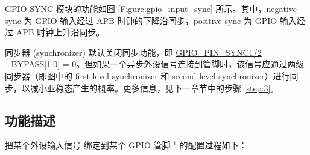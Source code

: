 \documentclass[main\_\_CN.tex]{subfiles}
\begin{document}
GPIO SYNC 模块的功能如图 \ref{Figure:gpio_input_sync} 所示。其中，negative sync 为 GPIO 输入经过 APB 时钟的下降沿同步，positive sync 为 GPIO 输入经过 APB 时钟上升沿同步。

同步器 (synchronizer) 默认关闭同步功能，即 \hyperref[fielddesc:GPIOPINNSYNC1BYPASS]{GPIO\_PIN\_SYNC1/2\\\_BYPASS[1:0]} = 0。但如果一个异步外设信号连接到管脚时，该信号应通过两级同步器（即图中的 first-level synchronizer 和 second-level synchronizer）进行同步，以减小亚稳态产生的概率。更多信息，见下一章节中的步骤 \ref{step:3}。

\subsection{功能描述}

把某个外设输入信号   绑定到某个 GPIO 管脚  \hyperref[input-note-1]{$^1$} 的配置过程如下：
\end{document}
